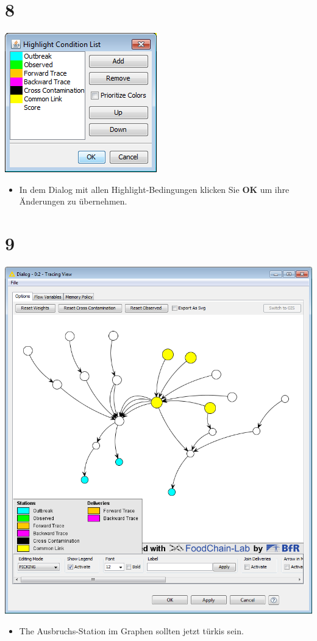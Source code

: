 \documentclass{beamer}
\begin{document}
\section{8}
\begin{frame}
	\begin{center}
  		\includegraphics[height=0.6\textheight]{8.png}
	\end{center}
	\begin{itemize}
		\item In dem Dialog mit allen Highlight-Bedingungen klicken Sie \textbf{OK} um ihre Änderungen zu übernehmen.
	\end{itemize}
\end{frame}

\section{9}
\begin{frame}
	\begin{center}
  		\includegraphics[height=0.6\textheight]{9.png}
	\end{center}
	\begin{itemize}
		\item The Ausbruchs-Station im Graphen sollten jetzt türkis sein.
	\end{itemize}
\end{frame}
\end{document}
